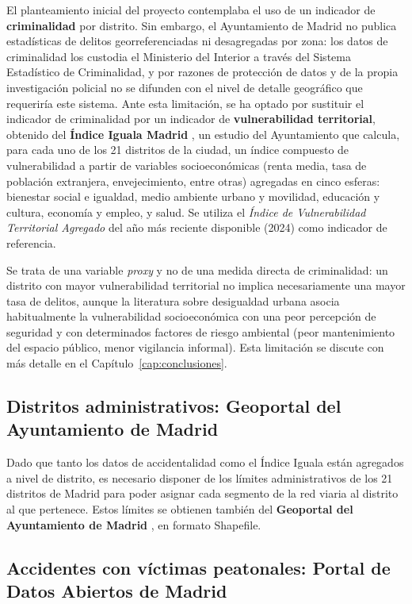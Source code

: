 El planteamiento inicial del proyecto contemplaba el uso de un indicador de \textbf{criminalidad} por distrito. Sin embargo, el Ayuntamiento de Madrid no publica estadísticas de delitos georreferenciadas ni desagregadas por zona: los datos de criminalidad los custodia el Ministerio del Interior a través del Sistema Estadístico de Criminalidad, y por razones de protección de datos y de la propia investigación policial no se difunden con el nivel de detalle geográfico que requeriría este sistema. Ante esta limitación, se ha optado por sustituir el indicador de criminalidad por un indicador de \textbf{vulnerabilidad territorial}, obtenido del \textbf{Índice Iguala Madrid} \cite{madridiguala}, un estudio del Ayuntamiento que calcula, para cada uno de los 21 distritos de la ciudad, un índice compuesto de vulnerabilidad a partir de variables socioeconómicas (renta media, tasa de población extranjera, envejecimiento, entre otras) agregadas en cinco esferas: bienestar social e igualdad, medio ambiente urbano y movilidad, educación y cultura, economía y empleo, y salud. Se utiliza el \textit{Índice de Vulnerabilidad Territorial Agregado} del año más reciente disponible (2024) como indicador de referencia.

Se trata de una variable \textit{proxy} y no de una medida directa de criminalidad: un distrito con mayor vulnerabilidad territorial no implica necesariamente una mayor tasa de delitos, aunque la literatura sobre desigualdad urbana asocia habitualmente la vulnerabilidad socioeconómica con una peor percepción de seguridad y con determinados factores de riesgo ambiental (peor mantenimiento del espacio público, menor vigilancia informal). Esta limitación se discute con más detalle en el Capítulo~\ref{cap:conclusiones}.

\subsection{Distritos administrativos: Geoportal del Ayuntamiento de Madrid}
\label{subsec:distritos_datos}

Dado que tanto los datos de accidentalidad como el Índice Iguala están agregados a nivel de distrito, es necesario disponer de los límites administrativos de los 21 distritos de Madrid para poder asignar cada segmento de la red viaria al distrito al que pertenece. Estos límites se obtienen también del \textbf{Geoportal del Ayuntamiento de Madrid} \cite{madridgeoportal}, en formato Shapefile.

\subsection{Accidentes con víctimas peatonales: Portal de Datos Abiertos de Madrid}
\label{subsec:accidentes_datos}

